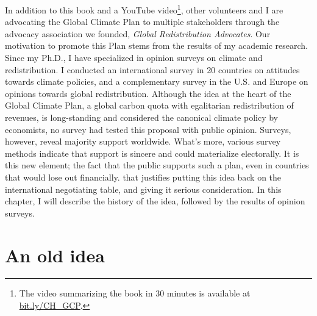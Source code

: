 \documentclass[a5paper,english,openany]{memoir}
\begin{document}
In addition to this book and a YouTube video\footnote{The video summarizing the book in 30 minutes is available at \href{https://bit.ly/CH_GCP}{bit.ly/CH\_GCP}.}, other volunteers and I are advocating the Global Climate Plan to multiple stakeholders through the advocacy association we founded, \textit{Global Redistribution Advocates}.%
Our motivation to promote %
this Plan stems from the results of my academic research. Since my Ph.D., I have specialized %
in opinion surveys on climate and redistribution. I conducted an international survey in 20 countries on attitudes towards climate policies, and a complementary survey in the U.S. and Europe on opinions towards global redistribution. Although the idea at the heart of the Global Climate Plan, %
a global carbon quota with egalitarian redistribution of revenues, %
is long-standing and considered the canonical climate policy by economists, no survey had tested this proposal with public opinion. Surveys, however, reveal majority support worldwide. What's more, various survey methods indicate that support is sincere and could materialize %
electorally. 
It is this new element; %
the fact that the public supports such a plan, %
even in countries that would lose out financially. %
that justifies putting this idea back on the international negotiating table, and giving it serious consideration. In this chapter, I will describe the history of the idea, followed by the results of opinion surveys.


\section*{An old idea} 
\end{document}

